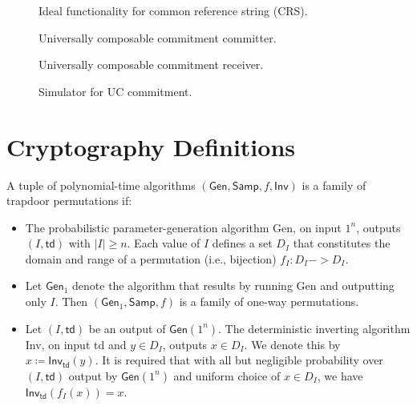 \begin{figure*}

\caption{Ideal functionality for common reference string (CRS).}
\label{fig:f-crs}
\end{figure*}

\begin{figure*}

\caption{Universally composable commitment committer.}
\label{fig:committer}
\end{figure*}

\begin{figure*}

\caption{Universally composable commitment receiver.}
\label{fig:receiver}
\end{figure*}

\begin{figure*}

\caption{Simulator for UC commitment.}
\label{fig:sim}
\end{figure*}

\section{Cryptography Definitions}

\begin{definition}
\end{definition}

\begin{definition}
  A tuple of polynomial-time algorithms $(\mathsf{Gen}, \mathsf{Samp},
  f, \textsf{Inv})$ is a family of trapdoor permutations if:
  \begin{itemize}[leftmargin=*]
    \item The probabilistic parameter-generation algorithm \textsf{Gen}, on
  input $1^n$, outputs $(I, \mathsf{td})$ with $\left| I \right| \geq n$. Each
  value of $I$ defines a set $D_I$ that constitutes the domain and range of a
  permutation (i.e., bijection) $f_I \colon D_I -> D_I$.
    \item Let $\mathsf{Gen}_1$ denote the algorithm that results by
  running \textsf{Gen} and outputting only $I$. Then
  $(\mathsf{Gen}_1, \mathsf{Samp}, f)$ is a family of one-way permutations.
    \item Let $(I, \mathsf{td})$ be an output of $\mathsf{Gen}(1^n)$. The
  deterministic inverting algorithm \textsf{Inv}, on input \textsf{td} and $y \in
  D_I$, outputs $x \in D_I$. We denote this by
  $x \coloneqq \mathsf{Inv}_{\mathsf{td}}(y)$. It is required that with all but
  negligible probability over $(I, \mathsf{td})$ output by $\mathsf{Gen}(1^n)$
  and uniform choice of $x \in D_I$, we have $\mathsf{Inv}_{\mathsf{td}}(f_I(x)) =
  x$.
  \end{itemize}
\end{definition}
